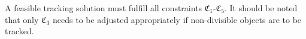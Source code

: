 \documentclass[10pt,twocolumn,letterpaper]{article}
\begin{document}
A feasible tracking solution must fulfill all constraints $\mathfrak{C}_1$-$\mathfrak{C}_5$. 
It should be noted that only $\mathfrak{C}_3$ needs to be adjusted appropriately if non-divisible objects 
are to be tracked.

\end{document}
